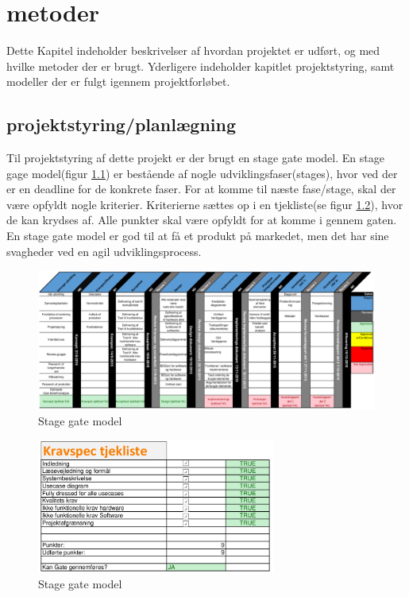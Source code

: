 \chapter{metoder}
Dette Kapitel indeholder beskrivelser af hvordan projektet er udført, og med hvilke metoder der er brugt. Yderligere indeholder kapitlet projektstyring, samt modeller der er fulgt igennem projektforløbet. 
\section{projektstyring/planlægning} 
Til projektstyring af dette projekt er der brugt en stage gate model. En stage gage model(figur \ref{fig:stage-gate}) er bestående af nogle udviklingsfaser(stages), hvor ved der er en deadline for de konkrete faser. For at komme til næste fase/stage, skal der være opfyldt nogle kriterier. Kriterierne sættes op i en tjekliste(se figur \ref{fig:stage-gate-tjekliste}), hvor de kan krydses af. Alle punkter skal være opfyldt for at komme i gennem gaten. En stage gate model er god til at få et produkt på markedet, men det har sine svagheder ved en agil udviklingsprocess. 
\begin{landscape}
\begin{figure}[H]
	\centering
	\includegraphics[width=1\textwidth]{billeder/Hovedrapport/Stage-gateP.PDF}
	\caption{Stage gate model}
	\label{fig:stage-gate}
\end{figure}
\end{landscape}

\begin{figure}[H]
	\centering
	\includegraphics[width=0.7\textwidth]{billeder/Hovedrapport/Stagegatetjekliste.PDF}
	\caption{Stage gate model}
	\label{fig:stage-gate-tjekliste}
\end{figure}

